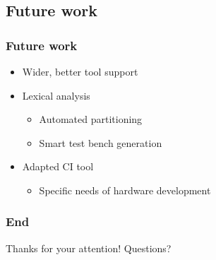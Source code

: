 \documentclass[british,10pt]{beamer}
\begin{document}
\subsection{Future work}

\begin{frame}\frametitle{Future work}
\begin{itemize}
\item Wider, better tool support
\item Lexical analysis
\begin{itemize}
\item Automated partitioning
\item Smart test bench generation
\end{itemize}
\item Adapted CI tool
\begin{itemize}
\item Specific needs of hardware development
\end{itemize}
\end{itemize}
\end{frame}


\begin{frame}\frametitle{End}
\centering
\Large
Thanks for your attention!
\vskip20pt
Questions?
\end{frame}
\end{document}
